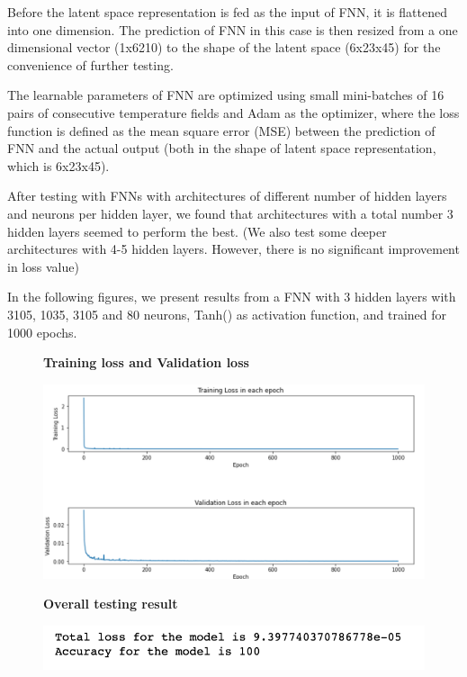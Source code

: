 Before the latent space representation is fed as the input of FNN, it is flattened into one dimension. The prediction of FNN in this case is then resized from a one dimensional vector (1x6210) to the shape of the latent space (6x23x45) for the convenience of further testing.

The learnable parameters of FNN are optimized using small mini-batches of 16 pairs of consecutive temperature fields and Adam as the optimizer, where the loss function is defined as the mean square error (MSE) between the prediction of FNN and the actual output (both in the shape of latent space representation, which is 6x23x45).

After testing with FNNs with architectures of different number of hidden layers and neurons per hidden layer, we found that architectures with a total number 3 hidden layers seemed to perform the best. (We also test some deeper architectures with 4-5 hidden layers. However, there is no significant improvement in loss value)

In the following figures, we present results from a FNN with 3 hidden layers with 3105, 1035, 3105 and 80 neurons, Tanh() as activation function, and trained for 1000 epochs.

\begin{figure}[H]
    \textbf{Training loss and Validation loss}\par\medskip
    \includegraphics[scale=0.6]{Report LaTeX/figures/mantle_convection_images/FNN_trainingData.png}
\end{figure}

\begin{figure}[H]
    \textbf{Overall testing result}\par\medskip
    \includegraphics[scale=0.7]{Report LaTeX/figures/mantle_convection_images/FNN_OverallTesting.png}
\end{figure}


